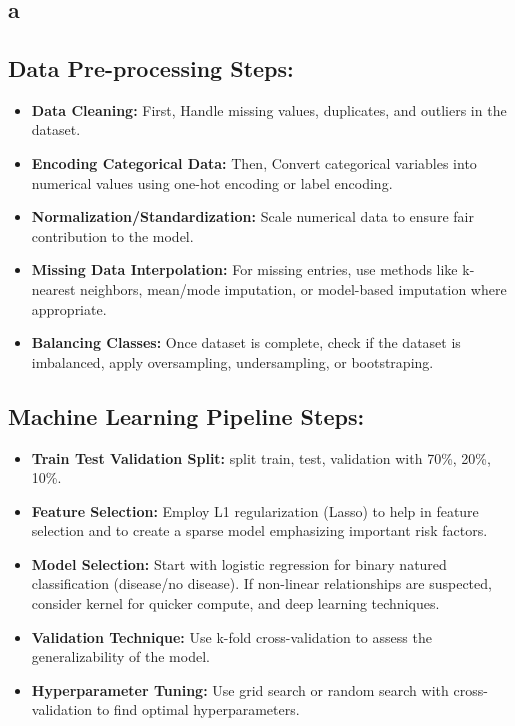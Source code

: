 \newpage
\section{}

\subsection{a}


\subsection*{Data Pre-processing Steps:}

\begin{itemize}
    \item \textbf{Data Cleaning:} First, Handle missing values, duplicates, and outliers in the dataset.
    \item \textbf{Encoding Categorical Data:} Then, Convert categorical variables into numerical values using one-hot encoding or label encoding.
    \item \textbf{Normalization/Standardization:} Scale numerical data to ensure fair contribution to the model.
    \item \textbf{Missing Data Interpolation:} For missing entries, use methods like k-nearest neighbors, mean/mode imputation, or model-based imputation where appropriate.
    \item \textbf{Balancing Classes:} Once dataset is complete, check if the dataset is imbalanced, apply oversampling, undersampling, or bootstraping.
\end{itemize}

\subsection*{Machine Learning Pipeline Steps:}

\begin{itemize}
    \item \textbf{Train Test Validation Split:} split train, test, validation with 70\%, 20\%, 10\%. 
    \item \textbf{Feature Selection:} Employ L1 regularization (Lasso) to help in feature selection and to create a sparse model emphasizing important risk factors.
    \item \textbf{Model Selection:} Start with logistic regression for binary natured classification (disease/no disease). If non-linear relationships are suspected, consider kernel for quicker compute, and deep learning techniques.
    \item \textbf{Validation Technique:} Use k-fold cross-validation to assess the generalizability of the model.
    \item \textbf{Hyperparameter Tuning:} Use grid search or random search with cross-validation to find optimal hyperparameters.
\end{itemize}

